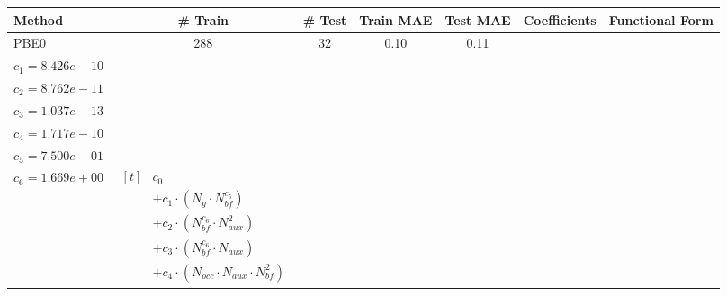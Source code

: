 \small
\setlength{\tabcolsep}{3pt}
\begin{longtable}{|l|c|c|c|c|p{3.2cm}|p{5.0cm}|}
\hline
\textbf{Method} & \textbf{\# Train} & \textbf{\# Test} & \textbf{Train MAE} & \textbf{Test MAE} & \textbf{Coefficients} & \textbf{Functional Form} \\ 
\hline
\endhead
PBE0 & 288 & 32 & 0.10 & 0.11 & \begin{tabular}{l}\(c_{0}=3.705e-12\) \\ \(c_{1}=8.426e-10\) \\ \(c_{2}=8.762e-11\) \\ \(c_{3}=1.037e-13\) \\ \(c_{4}=1.717e-10\) \\ \(c_{5}=7.500e-01\) \\ \(c_{6}=1.669e+00\)\end{tabular} & \parbox[t]{4.8cm}{\raggedright$\begin{aligned}[t]
& c_{0} \\ & + c_{1}  \cdot  (N_{g}  \cdot  N_{bf} ^{c_{5}}) \\ & + c_{2}  \cdot  (N_{bf} ^{c_{6}}  \cdot  N_{aux}^{2}) \\ & + c_{3}  \cdot  (N_{bf} ^{c_{6}}  \cdot  N_{aux}) \\ & + c_{4}  \cdot  (N_{occ}  \cdot  N_{aux}  \cdot  N_{bf} ^{2})
\end{aligned}$} \\ 
\hline
\end{longtable}
